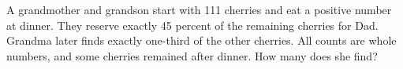 A grandmother and grandson start with 111 cherries and eat a positive number at dinner. They reserve exactly 45 percent of the remaining cherries for Dad. Grandma later finds exactly one-third of the other cherries. All counts are whole numbers, and some cherries remained after dinner. How many does she find?
